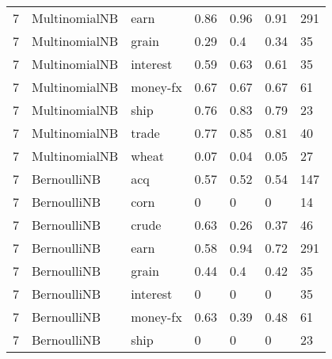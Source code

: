 \documentclass{article}
\begin{document}
\begin{table}[h]
\begin{tabular}{lllllll}
7             & MultinomialNB          & earn            & 0.86               & 0.96            & 0.91              & 291              \\
7             & MultinomialNB          & grain           & 0.29               & 0.4             & 0.34              & 35               \\
7             & MultinomialNB          & interest        & 0.59               & 0.63            & 0.61              & 35               \\
7             & MultinomialNB          & money-fx        & 0.67               & 0.67            & 0.67              & 61               \\
7             & MultinomialNB          & ship            & 0.76               & 0.83            & 0.79              & 23               \\
7             & MultinomialNB          & trade           & 0.77               & 0.85            & 0.81              & 40               \\
7             & MultinomialNB          & wheat           & 0.07               & 0.04            & 0.05              & 27               \\
7             & BernoulliNB            & acq             & 0.57               & 0.52            & 0.54              & 147              \\
7             & BernoulliNB            & corn            & 0                  & 0               & 0                 & 14               \\
7             & BernoulliNB            & crude           & 0.63               & 0.26            & 0.37              & 46               \\
7             & BernoulliNB            & earn            & 0.58               & 0.94            & 0.72              & 291              \\
7             & BernoulliNB            & grain           & 0.44               & 0.4             & 0.42              & 35               \\
7             & BernoulliNB            & interest        & 0                  & 0               & 0                 & 35               \\
7             & BernoulliNB            & money-fx        & 0.63               & 0.39            & 0.48              & 61               \\
7             & BernoulliNB            & ship            & 0                  & 0               & 0                 & 23               \\

\end{tabular}
\end{table}
\end{document}
